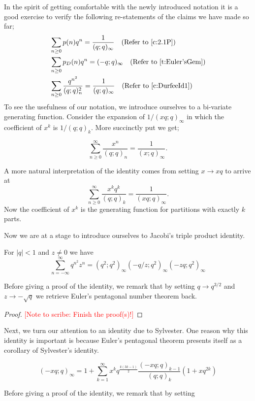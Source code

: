 \raggedbottom
In the spirit of getting comfortable with the newly introduced notation it is a good exercise to verify the following re-statements of the claims we have made so far;
\begin{align*}
    &\sum_{n \geq 0} p(n) q^n = \dfrac{1}{(q;q)_\infty} \quad (\text{Refer to } \cref{c:2.1P}) \\
    &\sum_{n \geq 0} p_D(n) q^n = (-q;q)_\infty \quad (\text{Refer to } \cref{t:Euler'sGem}) \\
    &\sum_{n \geq 0} \dfrac{q^{n^2}}{(q;q)_n^2} =\dfrac{1}{(q;q)_\infty}\quad (\text{Refer to } \cref{c:DurfeeId1})
\end{align*}
To see the usefulness of our notation, we introduce ourselves to a bi-variate generating function. Consider the expansion of $1/(xq;q)_\infty$ in which the coefficient of $x^k$ is $1/(q;q)_k$. More succinctly put we get;
\begin{claim}
\[\sum_{n\geq 0}^\infty\dfrac{x^n}{(q;q)_n} = \dfrac{1}{(x;q)_\infty}.\]
\end{claim}
A more natural interpretation of the identity comes from setting $x\to xq$ to arrive at
\[
\sum_{n\geq 0}^\infty \dfrac{x^kq^k}{(q;q)_k} = \dfrac{1}{(xq;q)_\infty}.
\]
Now the coefficient of $x^k$ is the generating function for partitions with exactly $k$ parts. 
\par
Now we are at a stage to introduce ourselves to Jacobi's triple product identity.
\begin{theorem}
For $|q|<1$ and $z\neq 0$ we have 
\[
\sum_{n=-\infty}^{\infty}q^{n^2}z^n = (q^2;q^2)_\infty (-q/z;q^2)_\infty (-zq;q^2)_\infty
\]
\end{theorem}
Before giving a proof of the identity, we remark that by setting $q\to q^{3/2}$ and $z\to -\sqrt{q}$ we retrieve Euler's pentagonal number theorem back. 
\begin{proof}
\textcolor{red}{[Note to scribe: Finish the proof(s)!]}
\end{proof}
Next, we turn our attention to an identity due to Sylvester. One reason why this identity is important is because Euler's pentagonal theorem presents itself as a corollary of Sylvester's identity. 
\begin{theorem}
\[
		\left( -xq;q \right)_{\infty} = 1+\sum_{k=1}^{\infty}x^kq^{\frac{k\left( 3k-1 \right) }{2}}\frac{\left( -xq;q \right)_{k-1}}{\left( q;q \right)_{k}}\left( 1+xq^{2k}\right)  
\]
\end{theorem}
Before giving a proof of the identity, we remark that by setting 
